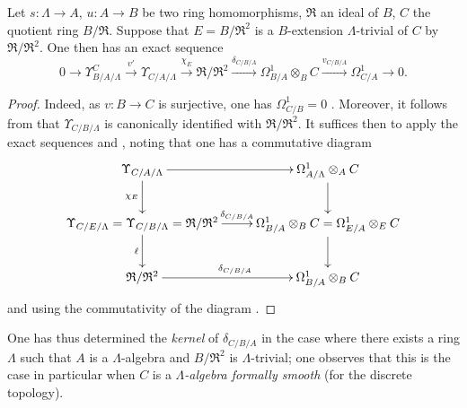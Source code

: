 \begin{proposition}[20.6.22]
\label{0.20.6.22}
Let $s:\Lambda\to A$, $u:A\to B$ be two ring homomorphisms, $\mathfrak{R}$ an ideal of $B$, $C$ the quotient ring $B/\mathfrak{R}$.
Suppose that $E=B/\mathfrak{R}^2$ is a $B$-extension $\Lambda$-trivial of $C$ by $\mathfrak{R}/\mathfrak{R}^2$.
One then has an exact sequence
\begin{equation}
\tag{20.6.22.1}
  \label{0.20.6.22.1}
  0\to\Upsilon^C_{B/A/\Lambda}\xrightarrow{v'}\Upsilon_{C/A/\Lambda}\xrightarrow{\chi_E}\mathfrak{R}/\mathfrak{R}^2\xrightarrow{\delta_{C/B/A}}\Omega^1_{B/A}\otimes_B C\xrightarrow{v_{C/B/A}}\Omega^1_{C/A}\to 0.
\end{equation}
\end{proposition}

\begin{proof}
Indeed, as $v:B\to C$ is surjective, one has $\Omega^1_{C/B}=0$ .
Moreover, it follows from  that $\Upsilon_{C/B/\Lambda}$ is canonically identified with $\mathfrak{R}/\mathfrak{R}^2$.
It suffices then to apply the exact sequences  and , noting that one has a commutative diagram
\[
\xymatrix{
  \Upsilon_{C/A/\Lambda} \ar[r] \ar[d]_{\chi_E} & \Omega^1_{A/\Lambda}\otimes_A C \ar[d] \\
  \Upsilon_{C/E/\Lambda}=\Upsilon_{C/B/\Lambda}=\mathfrak{R}/\mathfrak{R}^2 \ar[r]^-{\delta_{C/B/A}} \ar[d]_{\ell} & \Omega^1_{B/A}\otimes_B C=\Omega^1_{E/A}\otimes_E C \ar[d] \\
  \mathfrak{R}/\mathfrak{R}^2 \ar[r]^{\delta_{C/B/A}} & \Omega^1_{B/A}\otimes_B C
}
\]
and using the commutativity of the diagram .
\end{proof}

One has thus determined the \emph{kernel} of $\delta_{C/B/A}$ in the case where there exists a ring $\Lambda$ such that $A$ is a $\Lambda$-algebra and $B/\mathfrak{R}^2$ is $\Lambda$-trivial; one observes that this is the case in particular when $C$ is a \emph{$\Lambda$-algebra formally smooth} (for the discrete topology).

